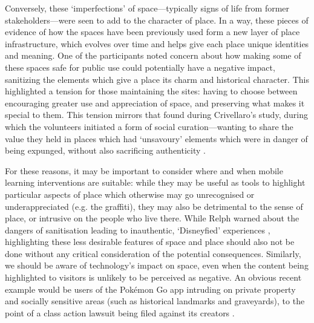 Conversely, these `imperfections' of space---typically signs of life from former stakeholders---were seen to add to the character of place. In a way, these pieces of evidence of how the spaces have been previously used form a new layer of place infrastructure, which evolves over time and helps give each place unique identities and meaning. One of the participants noted concern about how making some of these spaces safe for public use could potentially have a negative impact, sanitizing the elements which give a place its charm and historical character. This highlighted a tension for those maintaining the sites: having to choose between encouraging greater use and appreciation of space, and preserving what makes it special to them. This tension mirrors that found during Crivellaro's study, during which the volunteers initiated a form of social curation---wanting to share the value they held in places which had `unsavoury' elements which were in danger of being expunged, without also sacrificing authenticity \citep{Crivellaro2016}.

For these reasons, it may be important to consider where and when mobile learning interventions are suitable: while they may be useful as tools to highlight particular aspects of place which otherwise may go unrecognised or underappreciated (e.g. the graffiti), they may also be detrimental to the sense of place, or intrusive on the people who live there. While Relph warned about the dangers of sanitisation leading to inauthentic, `Disneyfied' experiences \citep{Relph2018}, highlighting these less desirable features of space and place should also not be done without any critical consideration of the potential consequences. Similarly, we should be aware of technology's impact on space, even when the content being highlighted to visitors is unlikely to be perceived as negative. An obvious recent example would be users of the Pok\'emon Go app intruding on private property and socially sensitive areas (such as historical landmarks and graveyards), to the point of a class action lawsuit being filed against its creators \citep{Marder2016}.

